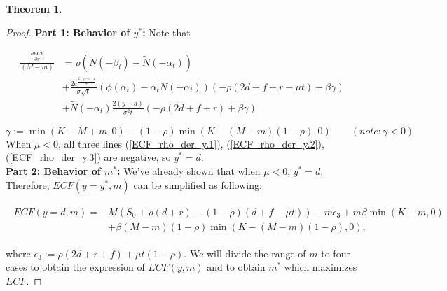 \documentclass[11pt]{article}
\theoremstyle{plain}
\numberwithin{equation}{section}
\newtheorem{thm}{Theorem}[section]
\begin{document}
{{\begin{thm}
\end{thm}

}

\begin{proof}
\noindent\textbf{Part 1: Behavior of $y^*$: }
	Note that
	
\begin{align}
\label{ECF_rho_der_y.1}
\frac{\frac{\partial ECF}{\partial y}}{ (M-m)} &=
\rho(N(-\beta_t)-\tilde{N}(-\alpha_t))\\
\label{ECF_rho_der_y.2}
&+\frac{2e^{\frac{2(y-d)\mu}{\sigma^2}} }{\sigma\sqrt{t}}
\left( \phi (\alpha_t ) -\alpha_t N(-\alpha_t)\right)
\left(-\rho (2d+f+r-\mu t)+ \beta \gamma \right) \\
\label{ECF_rho_der_y.3}
&+\tilde{N}(-\alpha_t)\frac{2(y-d)}{\sigma^2 t}\left(-\rho (2d+f+r)+ \beta \gamma \right) 
%
\end{align}


$$\gamma:=\min(K-M+m,0)-(1-\rho)\min (K-(M-m)(1-\rho),0)\quad \quad  (note: \gamma<0)
$$
When $\mu<0$, all three lines (\ref{ECF_rho_der_y.1}), (\ref{ECF_rho_der_y.2}), (\ref{ECF_rho_der_y.3}) are negative, so $y^*=d$.\\

\noindent\textbf{Part 2: Behavior of $m^*$: }
 We've already shown that when $\mu<0$, $y^*=d$. Therefore,  $ECF(y=y^*, m)$ can be simplified as following:

\begin{gather}
	\begin{aligned}
	ECF(y=d,m)=&M (S_0+\rho(d+r)-(1-\rho)(d+f-\mu t))-m\epsilon_3 +m\beta \min (K-m,0)\\
	&+\beta (M-m)(1-\rho) \min(K-(M-m)(1-\rho),0),
\end{aligned}\label{ecf:thm1p2c2}
\end{gather}

where $\epsilon_3:=\rho(2d+r+f)+\mu t(1-\rho)$. We will divide the range of $m$ to four cases to obtain the expression of $ECF(y,m)$ and to obtain $m^*$ which maximizes $ECF$. 


\end{proof}}
\end{document}
